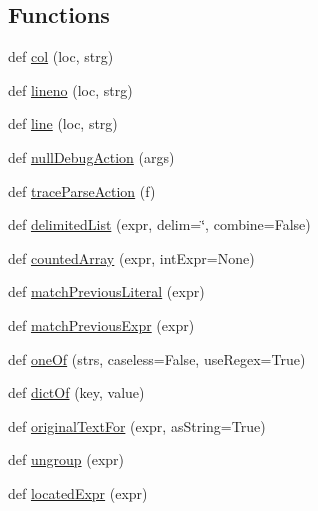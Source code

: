 \subsection*{Functions}
\begin{DoxyCompactItemize}
\item 
def \hyperlink{namespacepkg__resources_1_1__vendor_1_1pyparsing_a1710a17eb90f9df71a49b342cc9140b9}{col} (loc, strg)
\item 
def \hyperlink{namespacepkg__resources_1_1__vendor_1_1pyparsing_a0069c6f322a84243b4f42b7514a0276b}{lineno} (loc, strg)
\item 
def \hyperlink{namespacepkg__resources_1_1__vendor_1_1pyparsing_a2b9d7cf674162311ae0dfa5938ef17d6}{line} (loc, strg)
\item 
def \hyperlink{namespacepkg__resources_1_1__vendor_1_1pyparsing_a6531de2633eaf1f99f2223c323136e4c}{null\+Debug\+Action} (args)
\item 
def \hyperlink{namespacepkg__resources_1_1__vendor_1_1pyparsing_a40721f1128175810125acdda60e50294}{trace\+Parse\+Action} (f)
\item 
def \hyperlink{namespacepkg__resources_1_1__vendor_1_1pyparsing_aa689efbc59c6d46b1b9c16becee9f1b4}{delimited\+List} (expr, delim=\char`\"{},  combine=False)
\item 
def \hyperlink{namespacepkg__resources_1_1__vendor_1_1pyparsing_aedaae993defd888864f4b23fe0112c99}{counted\+Array} (expr, int\+Expr=None)
\item 
def \hyperlink{namespacepkg__resources_1_1__vendor_1_1pyparsing_acd7922e47c3b50a8096cca0ac412254c}{match\+Previous\+Literal} (expr)
\item 
def \hyperlink{namespacepkg__resources_1_1__vendor_1_1pyparsing_a8e0803c9f8d322929b12756be73323a8}{match\+Previous\+Expr} (expr)
\item 
def \hyperlink{namespacepkg__resources_1_1__vendor_1_1pyparsing_a21bd7ad8315ec4ff917eb4c83abcac85}{one\+Of} (strs, caseless=False, use\+Regex=True)
\item 
def \hyperlink{namespacepkg__resources_1_1__vendor_1_1pyparsing_a05a87efe0ddbc7738ba7ad4151bca0c4}{dict\+Of} (key, value)
\item 
def \hyperlink{namespacepkg__resources_1_1__vendor_1_1pyparsing_ad9d9ecdbe20991956a6ca594da564a96}{original\+Text\+For} (expr, as\+String=True)
\item 
def \hyperlink{namespacepkg__resources_1_1__vendor_1_1pyparsing_ab781c23a28afbeaa57480951e9d07217}{ungroup} (expr)
\item 
def \hyperlink{namespacepkg__resources_1_1__vendor_1_1pyparsing_a75102217255183b87789306aa8e311e6}{located\+Expr} (expr)

\end{DoxyCompactItemize}
